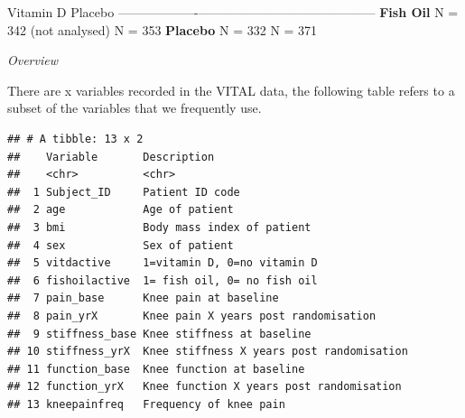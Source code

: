 \documentclass{article}
\begin{document}
\textbar{} \textbar{} Vitamin D \textbar{} Placebo \textbar{}
\textbar-------------------\textbar------------------------\textbar------------------\textbar{}
\textbar{} \textbf{Fish Oil} \textbar{} N = 342 (not analysed)
\textbar{} N = 353 \textbar{} \textbar{} \textbf{Placebo} \textbar{} N =
332 \textbar{} N = 371 \textbar{}

\emph{Overview}

There are x variables recorded in the VITAL data, the following table
refers to a subset of the variables that we frequently use.

\begin{verbatim}
## # A tibble: 13 x 2
##    Variable       Description                              
##    <chr>          <chr>                                    
##  1 Subject_ID     Patient ID code                          
##  2 age            Age of patient                           
##  3 bmi            Body mass index of patient               
##  4 sex            Sex of patient                           
##  5 vitdactive     1=vitamin D, 0=no vitamin D              
##  6 fishoilactive  1= fish oil, 0= no fish oil              
##  7 pain_base      Knee pain at baseline                    
##  8 pain_yrX       Knee pain X years post randomisation     
##  9 stiffness_base Knee stiffness at baseline               
## 10 stiffness_yrX  Knee stiffness X years post randomisation
## 11 function_base  Knee function at baseline                
## 12 function_yrX   Knee function X years post randomisation 
## 13 kneepainfreq   Frequency of knee pain
\end{verbatim}
\end{document}
